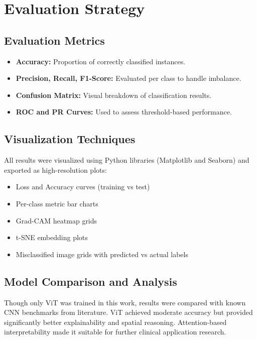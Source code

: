 \documentclass[a4paper,12pt]{report}
\begin{document}
\section{Evaluation Strategy}

\subsection{Evaluation Metrics}

\begin{itemize}
    \item \textbf{Accuracy:} Proportion of correctly classified instances.
    \item \textbf{Precision, Recall, F1-Score:} Evaluated per class to handle imbalance.
    \item \textbf{Confusion Matrix:} Visual breakdown of classification results.
    \item \textbf{ROC and PR Curves:} Used to assess threshold-based performance.
\end{itemize}

\subsection{Visualization Techniques}

All results were visualized using Python libraries (Matplotlib and Seaborn) and exported as high-resolution plots:
\begin{itemize}
    \item Loss and Accuracy curves (training vs test)
    \item Per-class metric bar charts
    \item Grad-CAM heatmap grids
    \item t-SNE embedding plots
    \item Misclassified image grids with predicted vs actual labels
\end{itemize}

\subsection{Model Comparison and Analysis}

Though only ViT was trained in this work, results were compared with known CNN benchmarks from literature. ViT achieved moderate accuracy but provided significantly better explainability and spatial reasoning. Attention-based interpretability made it suitable for further clinical application research.
\end{document}

